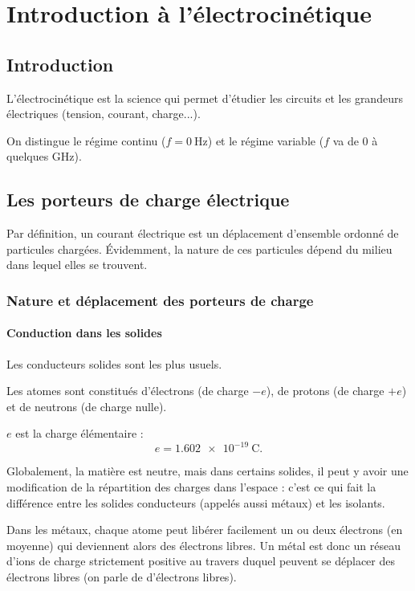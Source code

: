 \chapter{Introduction à l'électrocinétique}

\minitoc

\section*{Introduction}

L'électrocinétique est la science qui permet d'étudier les circuits et les grandeurs électriques (tension, courant, charge...).

On distingue le régime continu (\(f=\SI{0}{\hertz}\)) et le régime variable (\(f\) va de \(0\) à quelques \(\unit{\giga\hertz}\)).

\section{Les porteurs de charge électrique}

Par définition, un courant électrique est un déplacement d'ensemble ordonné de particules chargées. Évidemment, la nature de ces particules dépend du milieu dans lequel elles se trouvent.

\subsection{Nature et déplacement des porteurs de charge}

\subsubsection{Conduction dans les solides}

Les conducteurs solides sont les plus usuels.

Les atomes sont constitués d'électrons (de charge \(-e\)), de protons (de charge \(+e\)) et de neutrons (de charge nulle).

\(e\) est la charge élémentaire : \[e=\SI{1.602e-19}{\coulomb}.\]

Globalement, la matière est neutre, mais dans certains solides, il peut y avoir une modification de la répartition des charges dans l'espace : c'est ce qui fait la différence entre les solides conducteurs (appelés aussi métaux) et les isolants.

Dans les métaux, chaque atome peut libérer facilement un ou deux électrons (en moyenne) qui deviennent alors des électrons libres. Un métal est donc un réseau d'ions de charge strictement positive au travers duquel peuvent se déplacer des électrons libres (on parle de  d'électrons libres).


